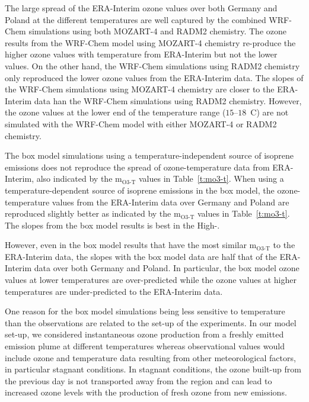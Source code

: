 The large spread of the ERA-Interim ozone values over both Germany and Poland at the different temperatures are well captured by the combined WRF-Chem simulations using both MOZART-4 and RADM2 chemistry. 
The ozone results from the WRF-Chem model using MOZART-4 chemistry re-produce the higher ozone values with temperature from ERA-Interim but not the lower values.
On the other hand, the WRF-Chem simulations using RADM2 chemistry only reproduced the lower ozone values from the ERA-Interim data.
The slopes of the WRF-Chem simulations using MOZART-4 chemistry are closer to the ERA-Interim data han the WRF-Chem simulations using RADM2 chemistry.
However, the ozone values at the lower end of the temperature range ($15$--$18$~\degree C) are not simulated with the WRF-Chem model with either MOZART-4 or RADM2 chemistry.

The box model simulations using a temperature-independent source of isoprene emissions does not reproduce the spread of ozone-temperature data from ERA-Interim, also indicated by the m$_{\text{O3-T}}$ values in Table~\ref{t:mo3-t}.
When using a temperature-dependent source of isoprene emissions in the box model, the ozone-temperature values from the ERA-Interim data over Germany and Poland are reproduced slightly better as indicated by the m$_{\text{O3-T}}$ values in Table~\ref{t:mo3-t}.
The slopes from the box model results is best in the High-.

However, even in the box model results that have the most similar m$_{\text{O3-T}}$ to the ERA-Interim data, the slopes with the box model data are half that of the ERA-Interim data over both Germany and Poland.
In particular, the box model ozone values at lower temperatures are over-predicted while the ozone values at higher temperatures are under-predicted to the ERA-Interim data.

One reason for the box model simulations being less sensitive to temperature than the observations are related to the set-up of the experiments.
In our model set-up, we considered instantaneous ozone production from a freshly emitted emission plume at different temperatures whereas observational values would include ozone and temperature data resulting from other meteorological factors, in particular stagnant conditions.
In stagnant conditions, the ozone built-up from the previous day is not transported away from the region and can lead to increased ozone levels with the production of fresh ozone from new emissions.

